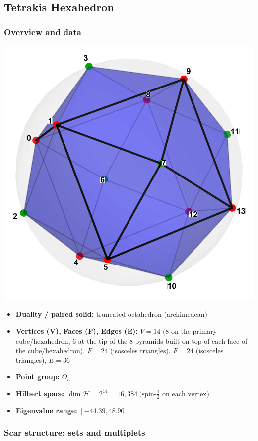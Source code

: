\documentclass[11pt,a4paper]{article}
\begin{document}
\subsection*{Tetrakis Hexahedron}

\subsubsection*{Overview and data}
\begin{center}
  \includegraphics[width=.6\linewidth]{tetrakishexahedron}
\end{center}

\begin{itemize}[leftmargin=1.5em]
  \item \textbf{Duality / paired solid:} truncated octahedron (archimedean)
  \item \textbf{Vertices (V), Faces (F), Edges (E):} $V = 14$  (8 on the primary cube/hexahedron, 6 at the tip of the 8 pyramids built on top of each face of the cube/hexahedron),\; $F = 24$ (isosceles triangles),\; $F = 24$ (isosceles triangles),\; $E = 36$
  \item \textbf{Point group:} $O_h$
  \item \textbf{Hilbert space:} \(
        \dim\mathcal{H} = 2^{14} = 16,384\ \text{(spin-$\tfrac12$ on each vertex)}
        \)
  \item \textbf{Eigenvalue range:} $[-44.39, 48.90]$
\end{itemize}

\subsubsection*{Scar structure: sets and multiplets}
\end{document}
